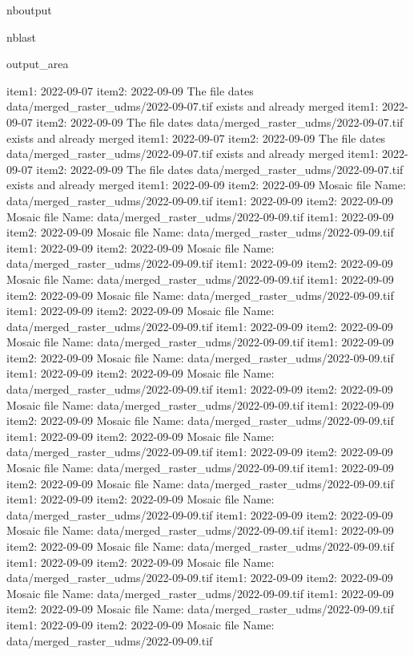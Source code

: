 \documentclass[letterpaper,10pt]{sphinxmanual}
\begin{document}
\begin{sphinxuseclass}{nboutput}
\begin{sphinxuseclass}{nblast}
{\begin{sphinxuseclass}{output_area}
\begin{sphinxuseclass}{}
\begin{sphinxVerbatim}[commandchars=\\\{\}]
item1:  2022-09-07
item2:  2022-09-09
The file dates data/merged\_raster\_udms/2022-09-07.tif exists and already merged
item1:  2022-09-07
item2:  2022-09-09
The file dates data/merged\_raster\_udms/2022-09-07.tif exists and already merged
item1:  2022-09-07
item2:  2022-09-09
The file dates data/merged\_raster\_udms/2022-09-07.tif exists and already merged
item1:  2022-09-07
item2:  2022-09-09
The file dates data/merged\_raster\_udms/2022-09-07.tif exists and already merged
item1:  2022-09-09
item2:  2022-09-09
Mosaic file Name:  data/merged\_raster\_udms/2022-09-09.tif
item1:  2022-09-09
item2:  2022-09-09
Mosaic file Name:  data/merged\_raster\_udms/2022-09-09.tif
item1:  2022-09-09
item2:  2022-09-09
Mosaic file Name:  data/merged\_raster\_udms/2022-09-09.tif
item1:  2022-09-09
item2:  2022-09-09
Mosaic file Name:  data/merged\_raster\_udms/2022-09-09.tif
item1:  2022-09-09
item2:  2022-09-09
Mosaic file Name:  data/merged\_raster\_udms/2022-09-09.tif
item1:  2022-09-09
item2:  2022-09-09
Mosaic file Name:  data/merged\_raster\_udms/2022-09-09.tif
item1:  2022-09-09
item2:  2022-09-09
Mosaic file Name:  data/merged\_raster\_udms/2022-09-09.tif
item1:  2022-09-09
item2:  2022-09-09
Mosaic file Name:  data/merged\_raster\_udms/2022-09-09.tif
item1:  2022-09-09
item2:  2022-09-09
Mosaic file Name:  data/merged\_raster\_udms/2022-09-09.tif
item1:  2022-09-09
item2:  2022-09-09
Mosaic file Name:  data/merged\_raster\_udms/2022-09-09.tif
item1:  2022-09-09
item2:  2022-09-09
Mosaic file Name:  data/merged\_raster\_udms/2022-09-09.tif
item1:  2022-09-09
item2:  2022-09-09
Mosaic file Name:  data/merged\_raster\_udms/2022-09-09.tif
item1:  2022-09-09
item2:  2022-09-09
Mosaic file Name:  data/merged\_raster\_udms/2022-09-09.tif
item1:  2022-09-09
item2:  2022-09-09
Mosaic file Name:  data/merged\_raster\_udms/2022-09-09.tif
item1:  2022-09-09
item2:  2022-09-09
Mosaic file Name:  data/merged\_raster\_udms/2022-09-09.tif
item1:  2022-09-09
item2:  2022-09-09
Mosaic file Name:  data/merged\_raster\_udms/2022-09-09.tif
item1:  2022-09-09
item2:  2022-09-09
Mosaic file Name:  data/merged\_raster\_udms/2022-09-09.tif
item1:  2022-09-09
item2:  2022-09-09
Mosaic file Name:  data/merged\_raster\_udms/2022-09-09.tif
item1:  2022-09-09
item2:  2022-09-09
Mosaic file Name:  data/merged\_raster\_udms/2022-09-09.tif
item1:  2022-09-09
item2:  2022-09-09
Mosaic file Name:  data/merged\_raster\_udms/2022-09-09.tif
item1:  2022-09-09
item2:  2022-09-09
Mosaic file Name:  data/merged\_raster\_udms/2022-09-09.tif
item1:  2022-09-09
item2:  2022-09-09
Mosaic file Name:  data/merged\_raster\_udms/2022-09-09.tif

\end{sphinxVerbatim}
\end{sphinxuseclass}
\end{sphinxuseclass}}
\end{sphinxuseclass}
\end{sphinxuseclass}
\end{document}
